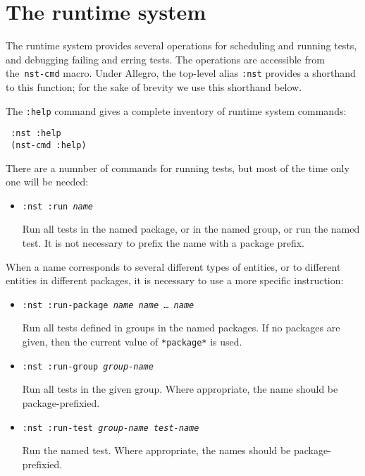 \section{The runtime system}
The runtime system provides several operations for scheduling and
running tests, and debugging failing and erring tests.  The operations
are accessible from
the~\texttt{nst-cmd} macro.  Under
Allegro, the top-level alias \texttt{:nst}
provides a shorthand to this function; for the sake of brevity we use
this shorthand below.

The \texttt{:help} command gives a complete inventory of runtime
system commands:
\begin{verbatim}
 :nst :help
 (nst-cmd :help)
\end{verbatim}

There are a numnber of commands for running tests, but most of the
time only one will be needed:
\begin{itemize}
\item\texttt{:nst :run {\itshape name}}
  \par Run all tests in the named package, or in the named group, or
  run the named test.  It is not necessary to prefix the name with a
  package prefix.
\end{itemize}
When a name corresponds to several different types of entities, or to
different entities in different packages, it is necessary to use a
more specific instruction:
\begin{itemize}
\item\texttt{:nst :run-package {\itshape name} {\itshape name} \ldots\ {\itshape name}}
  \par Run all tests defined in groups in the named packages.  If no
  packages are given, then the current value of \texttt{*package*} is
  used.
\item\texttt{:nst :run-group {\itshape group-name}}
  \par Run all tests in the given group.  Where appropriate, the name
  should be package-prefixied.
\item\texttt{:nst :run-test {\itshape group-name} {\itshape test-name}}
  \par Run the named test.  Where appropriate, the names should be
  package-prefixied.
\end{itemize}


